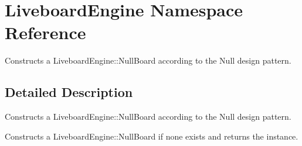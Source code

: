 \hypertarget{namespaceLiveboardEngine}{}\section{Liveboard\+Engine Namespace Reference}
\label{namespaceLiveboardEngine}


Constructs a Liveboard\+Engine\+::\+Null\+Board according to the Null design pattern.  




\subsection{Detailed Description}
Constructs a Liveboard\+Engine\+::\+Null\+Board according to the Null design pattern. 

Constructs a Liveboard\+Engine\+::\+Null\+Board if none exists and returns the instance. 